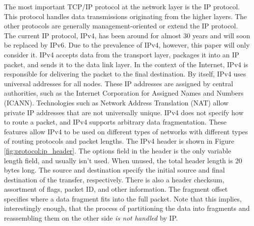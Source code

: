 The most important TCP/IP protocol at the network layer is the IP protocol. This protocol handles data transmissions originating from the higher layers. The other protocols are generally management-oriented or extend the IP protocol. The current IP protocol, IPv4, has been around for almost 30 years and will soon be replaced by IPv6. Due to the prevalence of IPv4, however, this paper will only consider it. IPv4 accepts data from the transport layer, packages it into an IP packet, and sends it to the data link layer. In the context of the Internet, IPv4 is responsible for delivering the packet to the final destination. By itself, IPv4 uses universal addresses for all nodes. These IP addresses are assigned by central authorities, such as the Internet Corporation for Assigned Names and Numbers (ICANN). Technologies such as Network Address Translation (NAT) allow private IP addresses that are not universally unique. IPv4 does not specify how to route a packet, and IPv4 supports arbitrary data fragmentation. These features allow IPv4 to be used on different types of networks with different types of routing protocols and packet lengths. The IPv4 header is shown in Figure \ref{fig:protocol:ip_header}. The options field in the header is the only variable length field, and usually isn't used. When unused, the total header length is 20 bytes long. The source and destination specify the initial source and final destination of the transfer, respectively. There is also a header checksum, assortment of flags, packet ID, and other information.  The fragment offset specifies where a data fragment fits into the full packet. Note that this implies, interestingly enough, that the process of partitioning the data into fragments and reassembling them on the other side \emph{is not handled} by IP. \cite{ref:2005-kozierok-tcpip_guide}

